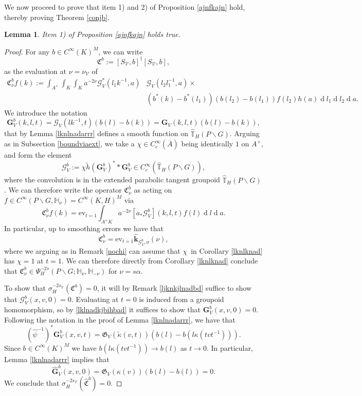 \documentclass[a4paper,reqno]{amsart}
\numberwithin{equation}{section}
\def\rd{\operatorname{d}\!}
\def\T{\mathbb{T}}
\newtheorem{lemma}[thm]{Lemma}
\theoremstyle{definition}
\theoremstyle{remark}
\begin{document}
We now proceed to prove that item 1) and 2) of Proposition \ref{ajnfkajn} hold, thereby proving Theorem \ref{conjb}. 

\begin{lemma}
Item 1) of Proposition \ref{ajnfkajn} holds true.
\end{lemma}

\begin{proof}
For any $b\in C^\infty(K)^M$, we can write 
$$\mathfrak{C}^b:=[S_{\mathcal{V}},b]^\dagger[S_{\mathcal{V}},b],$$
as the evaluation at $\nu=\nu_{\mathcal{V}}$ of
\begin{align*}
\mathfrak{C}^b_\nu f(k):=\int_{A^+}\int_{K}\int_K a^{-2\nu}  \mathcal{G}_V^*(l_1k^{-1},a)&\mathcal{G}_V(l_2l_1^{-1},a)\times\\
&(b^*(k)-b^*(l_1))(b(l_2)-b(l_1))f(l_2)h(a)\rd l_1\rd l_2\rd a.
\end{align*}
We introduce the notation 
$$\pmb{G}_V^b(k,l,t)=\mathcal{G}_V(lk^{-1},t)(b(l)-b(k))=\pmb{G}_V(k,l,t)(b(l)-b(k)),$$
that by Lemma \ref{lknlnadarrr} defines a smooth function on $\hat{\T}_H(P\backslash G)$. Arguing as in Subsection \ref{boundviaext}, we take a $\chi\in C^\infty_c(\overline{A})$ being identically $1$ on $A^+$, and form the element
\begin{equation}
\label{lklnadkjbihbad}
\pmb{\mathcal{G}}_V^b:=\chi\tilde{h}(\pmb{G}_V^b)^**\pmb{G}_V^b \in C^\infty_c(\hat{\T}_H(P\backslash G)),
\end{equation}
where the convolution is in the extended parabolic tangent groupoid $\hat{\T}_H(P\backslash G)$. We can therefore write the operator $\mathfrak{C}^b_\nu$ as acting on $f\in C^\infty(P\backslash G,\mathbb{H}_\nu)=C^\infty(K,H)^M$ via
$$\mathfrak{C}_\nu^bf(k)=\mathrm{ev}_{t=1}\int_{A^+K} a^{-2\nu} [a_*\pmb{\mathcal{G}}^b_V](k,l,t)f(l)\rd l \rd a.$$
In particular, up to smoothing errors we have that 
$$\mathfrak{C}^b_\nu=\mathrm{ev}_{t=1}\hat{\pmb{k}}_{\pmb{\mathcal{G}}_V^b,\sigma}(\nu),$$
where we arguing as in Remark \ref{nochi} can assume that $\chi$ in Corollary \ref{lknlknad} has $\chi=1$ at $t=1$. We can therefore directly from Corollary \ref{lknlknad} conclude that $\mathfrak{C}_\nu^b\in \Psi^{-2s}_H(P\backslash G;\mathbb{H}_\nu,\mathbb{H}_{-\nu})$ for $\nu=s\alpha$.


To show that $\sigma_H^{-2s_\mathcal{V}}(\mathfrak{C}^b)=0$, it will by Remark \ref{ljknkjlnadbd} suffice to show that $\pmb{\mathcal{G}}_V^b(x,v,0)=0$. Evaluating at $t=0$ is induced from a groupoid homomorphism, so by \eqref{lklnadkjbihbad} it suffices to show that $\pmb{G}_V^b(x,v,0)=0$. Following the notation in the proof of Lemma \ref{lknlnadarrr}, we have that 
$$(\hat{\psi}^{-1})^*\pmb{G}_V^b(x,v,t)=\mathfrak{G}_V(\tilde{\kappa}(v,t))(b(l)-b(l\kappa(tvt^{-1}))).$$
Since $b\in C^\infty(K)^M$ we have $b(l\kappa(tvt^{-1}))\to b(l)$ as $t\to 0$. In particular, Lemma \ref{lknlnadarrr} implies that 
$$\hat{\pmb{G}}_V^b(x,v,0)=\mathfrak{G}_V(\kappa(v))(b(l)-b(l))=0.$$
We conclude that $\sigma_H^{-2s_\mathcal{V}}(\hat{\mathfrak{C}}^b)=0$.
\end{proof}
\end{document}
